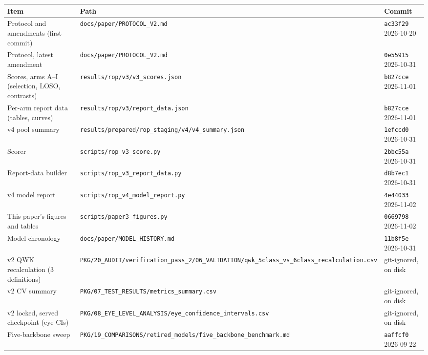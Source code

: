 \begin{tabular}{@{}>{\raggedright\arraybackslash}p{4.6cm}>{\raggedright\arraybackslash}p{9.6cm}l@{}}
\toprule
Item & Path & Commit\\
\midrule
Protocol and amendments (first commit) & \texttt{docs/\allowbreak{}paper/\allowbreak{}PROTOCOL\_V2.md} & \texttt{ac33f29} 2026-10-20 \\
Protocol, latest amendment & \texttt{docs/\allowbreak{}paper/\allowbreak{}PROTOCOL\_V2.md} & \texttt{0e55915} 2026-10-31 \\
Scores, arms A--I (selection, LOSO, contrasts) & \texttt{results/\allowbreak{}rop/\allowbreak{}v3/\allowbreak{}v3\_scores.json} & \texttt{b827cce} 2026-11-01 \\
Per-arm report data (tables, curves) & \texttt{results/\allowbreak{}rop/\allowbreak{}v3/\allowbreak{}report\_data.json} & \texttt{b827cce} 2026-11-01 \\
v4 pool summary & \texttt{results/\allowbreak{}prepared/\allowbreak{}rop\_staging/\allowbreak{}v4/\allowbreak{}v4\_summary.json} & \texttt{1efccd0} 2026-10-31 \\
Scorer & \texttt{scripts/\allowbreak{}rop\_v3\_score.py} & \texttt{2bbc55a} 2026-10-31 \\
Report-data builder & \texttt{scripts/\allowbreak{}rop\_v3\_report\_data.py} & \texttt{d8b7ec1} 2026-10-31 \\
v4 model report & \texttt{scripts/\allowbreak{}rop\_v4\_model\_report.py} & \texttt{4e44033} 2026-11-02 \\
This paper's figures and tables & \texttt{scripts/\allowbreak{}paper3\_figures.py} & \texttt{0669798} 2026-11-02 \\
Model chronology & \texttt{docs/\allowbreak{}paper/\allowbreak{}MODEL\_HISTORY.md} & \texttt{11b8f5e} 2026-10-31 \\
v2 QWK recalculation (3 definitions) & \texttt{PKG/\allowbreak{}20\_AUDIT/\allowbreak{}verification\_pass\_2/\allowbreak{}06\_VALIDATION/\allowbreak{}qwk\_5class\_vs\_6class\_recalculation.csv} & git-ignored, on disk \\
v2 CV summary & \texttt{PKG/\allowbreak{}07\_TEST\_RESULTS/\allowbreak{}metrics\_summary.csv} & git-ignored, on disk \\
v2 locked, served checkpoint (eye CIs) & \texttt{PKG/\allowbreak{}08\_EYE\_LEVEL\_ANALYSIS/\allowbreak{}eye\_confidence\_intervals.csv} & git-ignored, on disk \\
Five-backbone sweep & \texttt{PKG/\allowbreak{}19\_COMPARISONS/\allowbreak{}retired\_models/\allowbreak{}five\_backbone\_benchmark.md} & \texttt{aaffcf0} 2026-09-22 \\

\end{tabular}
